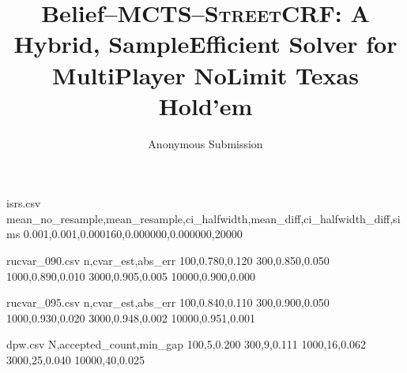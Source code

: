 \begin{filecontents*}{isrs.csv}
mean_no_resample,mean_resample,ci_halfwidth,mean_diff,ci_halfwidth_diff,sims
0.001,0.001,0.000160,0.000000,0.000000,20000
\end{filecontents*}

\begin{filecontents*}{rucvar_090.csv}
n,cvar_est,abs_err
100,0.780,0.120
300,0.850,0.050
1000,0.890,0.010
3000,0.905,0.005
10000,0.900,0.000
\end{filecontents*}

\begin{filecontents*}{rucvar_095.csv}
n,cvar_est,abs_err
100,0.840,0.110
300,0.900,0.050
1000,0.930,0.020
3000,0.948,0.002
10000,0.951,0.001
\end{filecontents*}

\begin{filecontents*}{dpw.csv}
N,accepted_count,min_gap
100,5,0.200
300,9,0.111
1000,16,0.062
3000,25,0.040
10000,40,0.025
\end{filecontents*}

\documentclass[10pt]{article}
\usepackage[margin=1in]{geometry}
\usepackage[T1]{fontenc}
\usepackage{lmodern}
\usepackage{textcomp}
\usepackage{amsmath,amssymb,amsfonts,amsthm}
\usepackage{mathtools}
\usepackage{graphicx}
\usepackage{booktabs}
\usepackage{microtype}
\usepackage{hyperref}
\usepackage{xspace}
\usepackage{verbatim}
\usepackage{float}

\newcommand{\sCRF}{\textsc{Street\textendash CRF}\xspace}
\newcommand{\CFRplus}{\ensuremath{\mathrm{CFR}^{+}}\xspace}
\newcommand{\E}{\mathbb{E}}
\newcommand{\Var}{\mathrm{Var}}
\newcommand{\KL}{\mathrm{KL}}
\newcommand{\CVaR}{\mathrm{CVaR}}
\newcommand{\VaR}{\mathrm{VaR}}
\newcommand{\BR}{\mathrm{BR}}
\newcommand{\States}{\mathcal{S}}
\newcommand{\Actions}{\mathcal{A}}
\newcommand{\IS}{\mathcal{I}}
\newcommand{\Players}{\mathcal{N}}
\newcommand{\Chance}{\mathsf{C}}
\newcommand{\Bel}{\rho}
\newcommand{\1}{\mathbf{1}}
\newcommand{\R}{\mathbb{R}}
\newcommand{\cref}[1]{\ref{#1}}
\newcommand{\Cref}[1]{\ref{#1}}

\theoremstyle{plain}
\newtheorem{definition}{Definition}
\newtheorem{assumption}{Assumption}
\newtheorem{lemma}{Lemma}
\newtheorem{proposition}{Proposition}
\newtheorem{theorem}{Theorem}
\newtheorem{corollary}{Corollary}

\title{Belief--MCTS--\sCRF: A Hybrid, Sample\textendash Efficient Solver for Multi\textendash Player No\textendash Limit Texas Hold'em}
\author{Anonymous Submission}
\date{}


